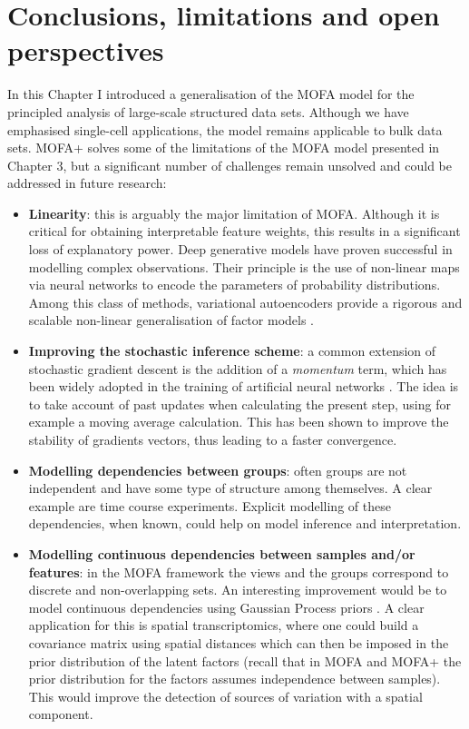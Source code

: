 \section{Conclusions, limitations and open perspectives}

In this Chapter I introduced a generalisation of the MOFA model for the principled analysis of large-scale structured data sets. Although we have emphasised single-cell applications, the model remains applicable to bulk data sets. MOFA+ solves some of the limitations of the MOFA model presented in Chapter 3, but a significant number of challenges remain unsolved and could be addressed in future research:

\begin{itemize}
	\item \textbf{Linearity}: this is arguably the major limitation of MOFA. Although it is critical for obtaining interpretable feature weights, this results in a significant loss of explanatory power. Deep generative models have proven successful in modelling complex observations. Their principle is the use of non-linear maps via neural networks to encode the parameters of probability distributions. Among this class of methods, variational autoencoders provide a rigorous and scalable non-linear generalisation of factor models \cite{Ainsworth2018}.

	\item \textbf{Improving the stochastic inference scheme}: a common extension of stochastic gradient descent is the addition of a \textit{momentum} term, which has been widely adopted in the training of artificial neural networks \cite{Zeiler2012,Ning1999}. The idea is to take account of past updates when calculating the present step, using for example a moving average calculation. This has been shown to improve the stability of gradients vectors, thus leading to a faster convergence.

	\item \textbf{Modelling dependencies between groups}: often groups are not independent and have some type of structure among themselves. A clear example are time course experiments. Explicit modelling of these dependencies, when known, could help on model inference and interpretation.

	\item \textbf{Modelling continuous dependencies between samples and/or features}: in the MOFA framework the views and the groups correspond to discrete and non-overlapping sets. An interesting improvement would be to model continuous dependencies using Gaussian Process priors \cite{Casale2018}. A clear application for this is spatial transcriptomics, where one could build a covariance matrix using spatial distances which can then be imposed in the prior distribution of the latent factors (recall that in MOFA and MOFA+ the prior distribution for the factors assumes independence between samples). This would improve the detection of sources of variation with a spatial component.
\end{itemize}
